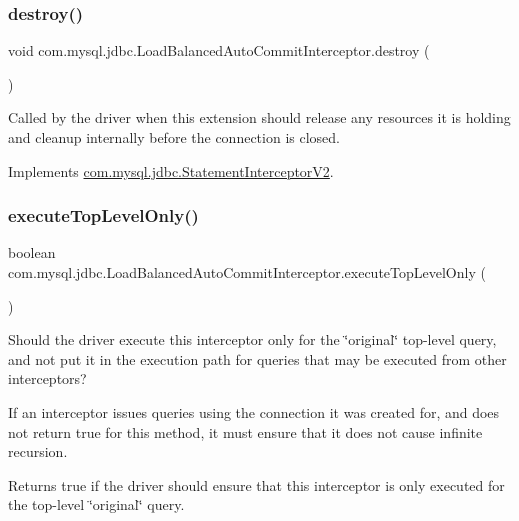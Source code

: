 \subsubsection{\texorpdfstring{destroy()}{destroy()}}
{\footnotesize\ttfamily void com.\+mysql.\+jdbc.\+Load\+Balanced\+Auto\+Commit\+Interceptor.\+destroy (\begin{DoxyParamCaption}{ }\end{DoxyParamCaption})}

Called by the driver when this extension should release any resources it is holding and cleanup internally before the connection is closed. 

Implements \mbox{\hyperlink{interfacecom_1_1mysql_1_1jdbc_1_1_statement_interceptor_v2_a00bfb3d3f7b81e16a9cdf4784150c3f7}{com.\+mysql.\+jdbc.\+Statement\+Interceptor\+V2}}.

\mbox{\label{classcom_1_1mysql_1_1jdbc_1_1_load_balanced_auto_commit_interceptor_afdb08603f13610a4d26d188bf171c232}} 
\subsubsection{\texorpdfstring{execute\+Top\+Level\+Only()}{executeTopLevelOnly()}}
{\footnotesize\ttfamily boolean com.\+mysql.\+jdbc.\+Load\+Balanced\+Auto\+Commit\+Interceptor.\+execute\+Top\+Level\+Only (\begin{DoxyParamCaption}{ }\end{DoxyParamCaption})}

Should the driver execute this interceptor only for the \char`\"{}original\char`\"{} top-\/level query, and not put it in the execution path for queries that may be executed from other interceptors?

If an interceptor issues queries using the connection it was created for, and does not return {\ttfamily true} for this method, it must ensure that it does not cause infinite recursion.

\begin{DoxyReturn}{Returns}
true if the driver should ensure that this interceptor is only executed for the top-\/level \char`\"{}original\char`\"{} query. 
\end{DoxyReturn}


